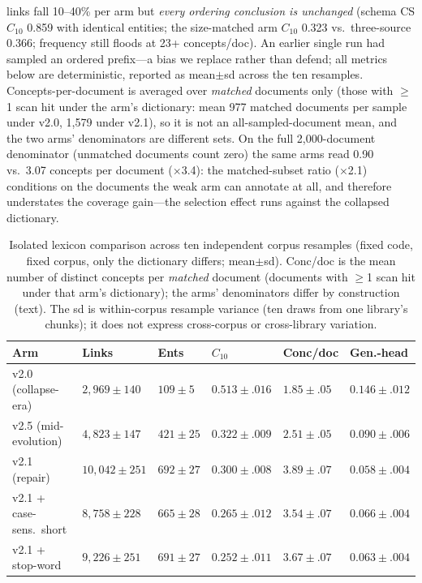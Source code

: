\documentclass[preprint,12pt]{elsarticle}
\begin{document}
links fall 10--40\% per arm but \emph{every ordering conclusion is
unchanged} (schema CS $C_{10}$ 0.859 with identical entities; the
size-matched arm $C_{10}$ 0.323 vs.\ three-source 0.366; frequency
still floods at 23+ concepts/doc). An
earlier single run had sampled an ordered prefix---a bias we replace
rather than defend; all metrics below are deterministic, reported as
mean$\pm$sd across the ten resamples. Concepts-per-document is averaged
over \emph{matched} documents only (those with $\geq$1 scan hit under
the arm's dictionary: mean 977 matched documents per sample under v2.0,
1{,}579 under v2.1), so it is not an all-sampled-document mean, and the
two arms' denominators are different sets. On the full
2{,}000-document denominator (unmatched documents count zero) the
same arms read 0.90 vs.\ 3.07 concepts per document ($\times$3.4):
the matched-subset ratio ($\times$2.1) conditions on the documents
the weak arm can annotate at all, and therefore understates the
coverage gain---the selection effect runs against the collapsed
dictionary.

\begin{table}[t]
\centering
\caption{Isolated lexicon comparison across ten independent corpus
resamples (fixed code, fixed corpus, only the dictionary differs;
mean$\pm$sd). Conc/doc is the mean number of distinct concepts per
\emph{matched} document (documents with $\geq$1 scan hit under that
arm's dictionary); the arms' denominators differ by construction (text).
The sd is within-corpus resample variance (ten draws from one
library's chunks); it does not express cross-corpus or cross-library
variation.}
\label{tab:lexiso}
\footnotesize
\setlength{\tabcolsep}{3pt}
\begin{tabularx}{\textwidth}{l>{\hsize=1.12\hsize}X>{\hsize=0.78\hsize}X>{\hsize=1.16\hsize}X>{\hsize=0.78\hsize}X>{\hsize=1.16\hsize}X}
\toprule
Arm & Links & Ents & $C_{10}$ & Conc/doc & Gen.-head \\
\midrule
v2.0 (collapse-era) & $2{,}969\pm140$ & $109\pm5$ & $0.513\pm.016$ & $1.85\pm.05$ & $0.146\pm.012$ \\
v2.5 (mid-evolution) & $4{,}823\pm147$ & $421\pm25$ & $0.322\pm.009$ & $2.51\pm.05$ & $0.090\pm.006$ \\
v2.1 (repair) & $10{,}042\pm251$ & $692\pm27$ & $0.300\pm.008$ & $3.89\pm.07$ & $0.058\pm.004$ \\
v2.1 + case-sens.\ short & $8{,}758\pm228$ & $665\pm28$ & $0.265\pm.012$ & $3.54\pm.07$ & $0.066\pm.004$ \\
v2.1 + stop-word & $9{,}226\pm251$ & $691\pm27$ & $0.252\pm.011$ & $3.67\pm.07$ & $0.063\pm.004$ \\
\bottomrule
\end{tabularx}
\end{table}
\end{document}

